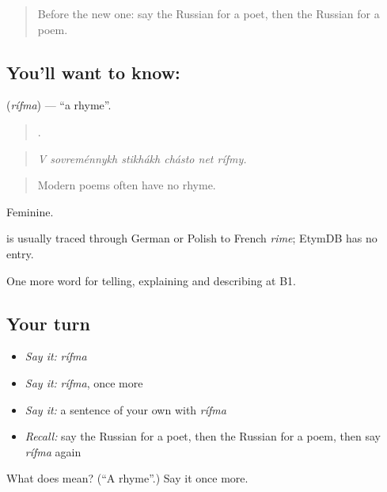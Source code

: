 \begin{quote}
Before the new one: say the Russian for a poet, then the Russian for a poem.
\end{quote}

\subsection*{You'll want to know: }
\textbf{} (\emph{rífma}) — \textquotedblleft{}a rhyme\textquotedblright{}.

\begin{quote}
     .
\end{quote}

\begin{quote}
\emph{V sovreménnykh stikhákh chásto net rífmy.}
\end{quote}

\begin{quote}
Modern poems often have no rhyme.
\end{quote}

Feminine.

\begin{cousinweb}
\emph{} is usually traced through German or Polish to French \emph{rime}; EtymDB has no entry.
\end{cousinweb}

\begin{grammarlens}[title={What you've built}]
One more word for telling, explaining and describing at B1.
\end{grammarlens}

\subsection*{Your turn}
\begin{itemize}
\raggedright
  \item \emph{Say it:} \emph{rífma}
  \item \emph{Say it:} \emph{rífma}, once more
  \item \emph{Say it:} a sentence of your own with \emph{rífma}
  \item \emph{Recall:} say the Russian for a poet, then the Russian for a poem, then say \emph{rífma} again
\end{itemize}

\begin{tcolorbox}[breakable,colback=teal!4,colframe=teal!35!black,title={Before you move on}]
What does  mean? (\textquotedblleft{}A rhyme\textquotedblright{}.) Say it once more.
\end{tcolorbox}
